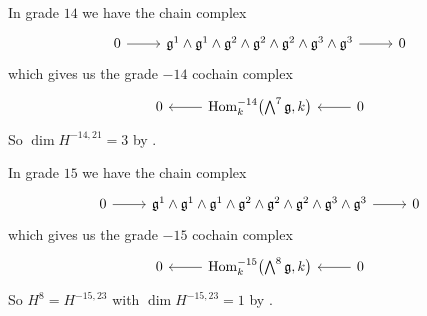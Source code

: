 In grade $14$ we have the chain complex
\[
  \begin{tikzcd}
    0 \ar[r] & \lie{g}^{1} \wedge \lie{g}^{1} \wedge \lie{g}^{2} \wedge \lie{g}^{2} \wedge \lie{g}^{2} \wedge \lie{g}^{3} \wedge \lie{g}^{3}  \ar[r] & 0
  \end{tikzcd}
\]
which gives us the grade $-14$ cochain complex
\[
  \begin{tikzcd}
    0 & \ar[l] \Hom_{k}^{-14}\bigl( \bigwedge^{7}\lie{g},k \bigr) & \ar[l] 0
  \end{tikzcd}
\]
So $\dim H^{-14,21} = 3$ by .

In grade $15$ we have the chain complex
\[
  \begin{tikzcd}
    0 \ar[r] & \lie{g}^{1} \wedge \lie{g}^{1} \wedge \lie{g}^{1} \wedge \lie{g}^{2} \wedge \lie{g}^{2} \wedge \lie{g}^{2} \wedge \lie{g}^{3} \wedge \lie{g}^{3}  \ar[r] & 0
  \end{tikzcd}
\]
which gives us the grade $-15$ cochain complex
\[
  \begin{tikzcd}
    0 & \ar[l] \Hom_{k}^{-15}\bigl( \bigwedge^{8}\lie{g},k \bigr) & \ar[l] 0
  \end{tikzcd}
\]
So $H^{8} = H^{-15,23}$ with $\dim H^{-15,23} = 1$ by .

